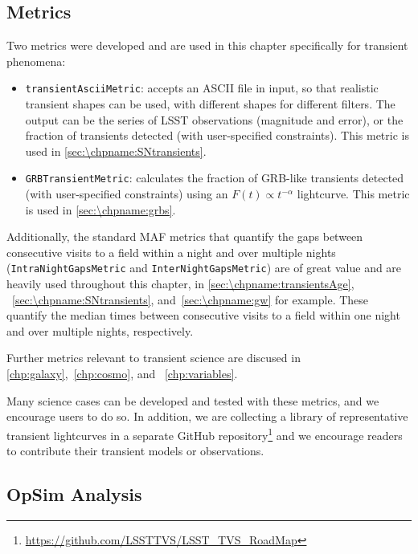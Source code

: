 
\subsection{Metrics}
\label{sec:\chpname:metrics}

Two metrics were developed and are used in this chapter specifically for transient phenomena:
\begin{itemize}
  \item{\texttt{transientAsciiMetric}: accepts an ASCII file in input, so that realistic transient shapes can be used, with different shapes for different filters. The output can be the series of LSST observations (magnitude and error), or the fraction of transients detected (with user-specified constraints). This metric is used in \autoref{sec:\chpname:SNtransients}.}
  \item{\texttt{GRBTransientMetric}: calculates the fraction of GRB-like transients detected (with user-specified constraints) using an $F(t) \propto t^{-\alpha}$
    lightcurve. This metric is used in \autoref{sec:\chpname:grbs}}.
\end{itemize}

Additionally, the standard MAF metrics
that quantify the gaps between consecutive visits to
a field within a night and over multiple nights
(\texttt{IntraNightGapsMetric} and \texttt{InterNightGapsMetric})
are of great value and are
heavily used throughout this chapter, in \autoref{sec:\chpname:transientsAge},
~\autoref{sec:\chpname:SNtransients}, and~\autoref{sec:\chpname:gw} for example.
These quantify the median times between consecutive visits to a field
within one night and over multiple nights, respectively.

Further metrics relevant to transient science are discused in \autoref{chp:galaxy},~\autoref{chp:cosmo}, and ~\autoref{chp:variables}.

Many science cases can be developed and tested with these metrics, and we
encourage users to do so. In addition, we are collecting a library of representative transient lightcurves in a separate GitHub repository\footnote{\url{https://github.com/LSSTTVS/LSST_TVS_RoadMap}} and we encourage readers to contribute their transient models or observations.



\subsection{OpSim Analysis}
\label{sec:\chpname:analysis}

